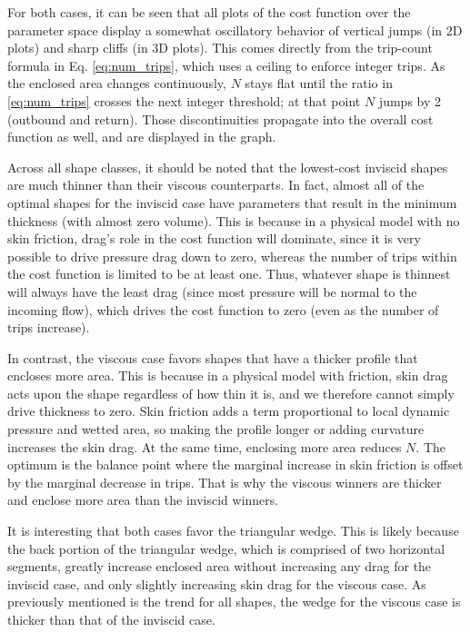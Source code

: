 \documentclass[11pt]{article}
\begin{document}
For both cases, it can be seen that all plots of the cost function over the parameter space display a somewhat oscillatory behavior of vertical jumps (in 2D plots) and sharp cliffs (in 3D plots). This comes directly from the trip-count formula in Eq. \ref{eq:num_trips}, which uses a ceiling to enforce integer trips. As the enclosed area changes continuously, $N$ stays flat until the ratio in \ref{eq:num_trips} crosses the next integer threshold; at that point $N$ jumps by 2 (outbound and return). Those discontinuities propagate into the overall cost function as well, and are displayed in the graph.

Across all shape classes, it should be noted that the lowest-cost inviscid shapes are much thinner than their viscous counterparts. In fact, almost all of the optimal shapes for the inviscid case have parameters that result in the minimum thickness (with almost zero volume). This is because in a physical model with no skin friction, drag's role in the cost function will dominate, since it is very possible to drive pressure drag down to zero, whereas the number of trips within the cost function is limited to be at least one. Thus, whatever shape is thinnest will always have the least drag (since most pressure will be normal to the incoming flow), which drives the cost function to zero (even as the number of trips increase).

In contrast, the viscous case favors shapes that have a thicker profile that encloses more area. This is because in a physical model with friction, skin drag acts upon the shape regardless of how thin it is, and we therefore cannot simply drive thickness to zero. Skin friction adds a term proportional to local dynamic pressure and wetted area, so making the profile longer or adding curvature increases the skin drag. At the same time, enclosing more area reduces $N$. The optimum is the balance point where the marginal increase in skin friction is offset by the marginal decrease in trips. That is why the viscous winners are thicker and enclose more area than the inviscid winners.

It is interesting that both cases favor the triangular wedge. This is likely because the back portion of the triangular wedge, which is comprised of two horizontal segments, greatly increase enclosed area without increasing any drag for the inviscid case, and only slightly increasing skin drag for the viscous case. As previously mentioned is the trend for all shapes, the wedge for the viscous case is thicker than that of the inviscid case.
\end{document}
